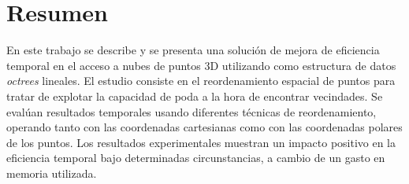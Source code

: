 \pagestyle{plain}
\chapter*{Resumen}

En este trabajo se describe y se presenta una solución de mejora de eficiencia temporal en el acceso a 
nubes de puntos 3D utilizando como estructura de datos \textit{octrees} lineales. El estudio consiste en el reordenamiento espacial
 de puntos para tratar de explotar la capacidad de poda a la hora de encontrar vecindades. Se evalúan resultados temporales usando diferentes técnicas de reordenamiento, operando tanto con las coordenadas cartesianas como con las coordenadas polares de los puntos. Los resultados experimentales muestran un impacto positivo en la eficiencia temporal bajo determinadas circunstancias, a cambio de un gasto en memoria utilizada.


